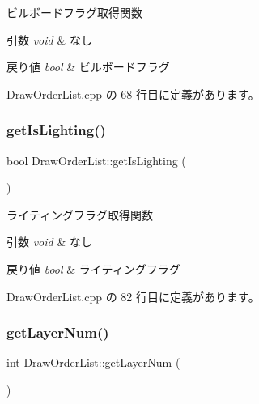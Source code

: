 ビルボードフラグ取得関数 


\begin{DoxyParams}{引数}
{\em void} & なし \\
\hline
\end{DoxyParams}

\begin{DoxyRetVals}{戻り値}
{\em bool} & ビルボードフラグ \\
\hline
\end{DoxyRetVals}


 Draw\+Order\+List.\+cpp の 68 行目に定義があります。

\mbox{\label{class_draw_order_list_a1015463f08f8bf1118d5d1f79029d869}} 
\subsubsection{\texorpdfstring{get\+Is\+Lighting()}{getIsLighting()}}
{\footnotesize\ttfamily bool Draw\+Order\+List\+::get\+Is\+Lighting (\begin{DoxyParamCaption}{ }\end{DoxyParamCaption})}



ライティングフラグ取得関数 


\begin{DoxyParams}{引数}
{\em void} & なし \\
\hline
\end{DoxyParams}

\begin{DoxyRetVals}{戻り値}
{\em bool} & ライティングフラグ \\
\hline
\end{DoxyRetVals}


 Draw\+Order\+List.\+cpp の 82 行目に定義があります。

\mbox{\label{class_draw_order_list_afe5cb8651814f631146c91e6428c0b6d}} 
\subsubsection{\texorpdfstring{get\+Layer\+Num()}{getLayerNum()}}
{\footnotesize\ttfamily int Draw\+Order\+List\+::get\+Layer\+Num (\begin{DoxyParamCaption}{ }\end{DoxyParamCaption})}



